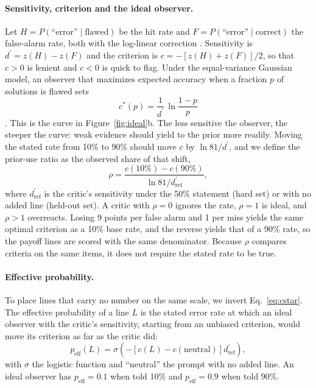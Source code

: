 \documentclass[letterpaper]{article} %
\newcommand{\dprime}{d^{\prime}}
\newcommand{\peff}{p_{\mathrm{eff}}}
\begin{document}
\paragraph{Sensitivity, criterion and the ideal observer.} Let $H=P(\text{``error''}\mid\text{flawed})$ be the hit rate and $F=P(\text{``error''}\mid\text{correct})$ the false-alarm rate, both with the log-linear correction \citep{hautus1995corrections}. Sensitivity is $\dprime=z(H)-z(F)$ and the criterion is $c=-[z(H)+z(F)]/2$, so that $c>0$ is lenient and $c<0$ is quick to flag. Under the equal-variance Gaussian model, an observer that maximizes expected accuracy when a fraction $p$ of solutions is flawed sets
\begin{equation}
c^*(p)=\frac{1}{\dprime}\,\ln\frac{1-p}{p}
\label{eq:cstar}
\end{equation}
\citep{green1966signal,lynn2014utilizing}. This is the curve in Figure~\ref{fig:ideal}b. The less sensitive the observer, the steeper the curve: weak evidence should yield to the prior more readily. Moving the stated rate from 10\% to 90\% should move $c$ by $\ln 81/\dprime$, and we define the prior-use ratio as the observed share of that shift,
\begin{equation}
\rho=\frac{c(10\%)-c(90\%)}{\ln 81/\dprime_{\mathrm{ref}}},
\label{eq:rho}
\end{equation}
where $\dprime_{\mathrm{ref}}$ is the critic's sensitivity under the 50\% statement (hard set) or with no added line (held-out set). A critic with $\rho=0$ ignores the rate, $\rho=1$ is ideal, and $\rho>1$ overreacts. Losing 9 points per false alarm and 1 per miss yields the same optimal criterion as a 10\% base rate, and the reverse yields that of a 90\% rate, so the payoff lines are scored with the same denominator. Because $\rho$ compares criteria on the same items, it does not require the stated rate to be true.

\paragraph{Effective probability.} To place lines that carry no number on the same scale, we invert Eq.~\ref{eq:cstar}. The effective probability of a line $L$ is the stated error rate at which an ideal observer with the critic's sensitivity, starting from an unbiased criterion, would move its criterion as far as the critic did:
\begin{equation}
\peff(L)=\sigma\!\left(-\left[c(L)-c(\text{neutral})\right]\dprime_{\mathrm{ref}}\right),
\label{eq:peff}
\end{equation}
with $\sigma$ the logistic function and ``neutral'' the prompt with no added line. An ideal observer has $\peff=0.1$ when told 10\% and $\peff=0.9$ when told 90\%.
\end{document}
